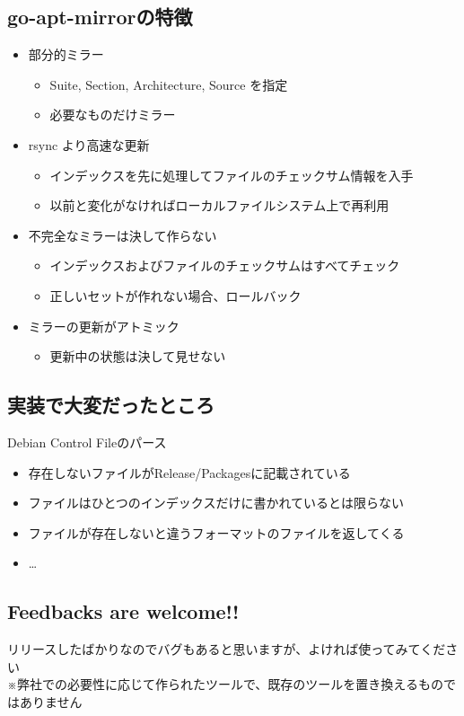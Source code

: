 \documentclass[mingoth,a4paper]{jsarticle}
\begin{document}
\subsection{go-apt-mirrorの特徴}
\begin{itemize}
 \item 部分的ミラー
\begin{itemize}
 \item Suite, Section, Architecture, Source を指定
 \item 必要なものだけミラー
\end{itemize}
 \item rsync より高速な更新
\begin{itemize}
 \item インデックスを先に処理してファイルのチェックサム情報を入手
 \item 以前と変化がなければローカルファイルシステム上で再利用
\end{itemize}
 \item 不完全なミラーは決して作らない
\begin{itemize}
 \item インデックスおよびファイルのチェックサムはすべてチェック
 \item 正しいセットが作れない場合、ロールバック
\end{itemize}
 \item ミラーの更新がアトミック
\begin{itemize}
 \item 更新中の状態は決して見せない
\end{itemize}
\end{itemize}
\subsection{実装で大変だったところ}
Debian Control Fileのパース
\begin{itemize}
 \item 存在しないファイルがRelease/Packagesに記載されている
 \item ファイルはひとつのインデックスだけに書かれているとは限らない
 \item ファイルが存在しないと違うフォーマットのファイルを返してくる
 \item …
\end{itemize}
\subsection{Feedbacks are welcome!!}
リリースしたばかりなのでバグもあると思いますが、よければ使ってみてください\\
※弊社での必要性に応じて作られたツールで、既存のツールを置き換えるものではありません
\end{document}
